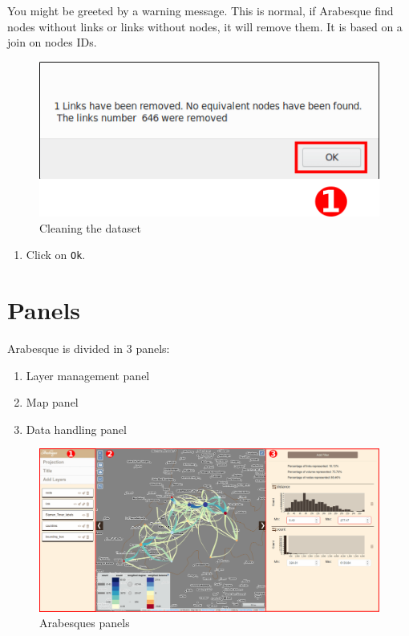 \documentclass[]{book}
\providecommand{\tightlist}{%
  \setlength{\itemsep}{0pt}\setlength{\parskip}{0pt}}
\begin{document}
You might be greeted by a warning message. This is normal, if Arabesque find nodes
without links or links without nodes, it will remove them. It is based on a
join on nodes IDs.

\begin{figure}
\centering
\includegraphics{images/functions/02_functions_swiss_example_warning.png}
\caption{Cleaning the dataset}
\end{figure}

\begin{enumerate}
\def\labelenumi{\arabic{enumi}.}
\tightlist
\item
  Click on \texttt{Ok}.
\end{enumerate}

\hypertarget{panels}{%
\section{Panels}\label{panels}}

Arabesque is divided in 3 panels:

\begin{enumerate}
\def\labelenumi{\arabic{enumi}.}
\tightlist
\item
  Layer management panel
\item
  Map panel
\item
  Data handling panel
\end{enumerate}

\begin{figure}
\centering
\includegraphics{images/functions/03_functions_swiss_example_main_window.png}
\caption{Arabesques panels}
\end{figure}
\end{document}
